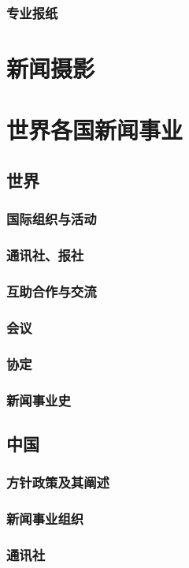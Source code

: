 \documentclass[UTF8]{../../ApplicationUniverse}
\begin{document}
    \subsubsection{专业报纸}
\section{新闻摄影}
\section{世界各国新闻事业}
    \subsection{世界}
        \subsubsection{国际组织与活动}
        \subsubsection{通讯社、报社}
        \subsubsection{互助合作与交流}
        \subsubsection{会议}
        \subsubsection{协定}
        \subsubsection{新闻事业史}
    \subsection{中国}
        \subsubsection{方针政策及其阐述}
        \subsubsection{新闻事业组织}
        \subsubsection{通讯社}
\end{document}

